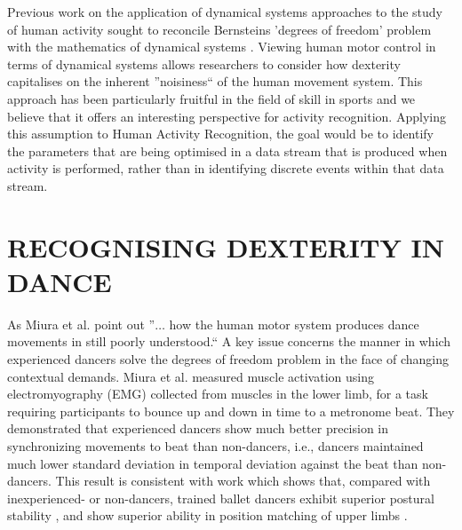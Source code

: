 \documentclass{sigchi}
\begin{document}
Previous work on the application of dynamical systems approaches to the study of human activity sought to 
reconcile Bernsteins  \cite{Bernstein1967} 'degrees of freedom' problem with the mathematics 
of dynamical systems \cite{Kugler1982}.
Viewing human motor control in terms of 
dynamical systems allows researchers to consider how dexterity capitalises on the inherent ''noisiness`` of the human 
movement system. This approach has been particularly fruitful in the field of skill in sports \cite{Davids2003}
and we believe that it offers an interesting perspective for activity recognition. 
Applying this assumption to Human Activity Recognition, the goal would be to identify the parameters that are being 
optimised in a data stream that is produced when activity is performed, rather than in identifying 
discrete events within that data stream. 
 




\section{RECOGNISING DEXTERITY IN DANCE }
As Miura et al. \cite{Miura2015} point out ''$\ldots$ how the human motor system produces dance movements in still 
poorly understood.`` A key issue concerns the manner in which experienced dancers solve the degrees of freedom 
problem in the face of changing contextual demands.  Miura et al. \cite{Miura2013} measured muscle activation 
using electromyography (EMG) collected from muscles in the lower limb, for a task requiring participants to 
bounce up and down in time to a metronome beat.  They demonstrated that experienced dancers show much better 
precision in synchronizing movements to beat than non-dancers, i.e., dancers maintained much lower standard 
deviation in temporal deviation against the beat than non-dancers. This result is consistent with work which 
shows that, compared with inexperienced- or non-dancers, trained ballet dancers exhibit superior postural 
stability \cite{Crotts1996} %
, and show superior ability in position matching of upper limbs \cite{Ramsay2001}.%
\end{document}
